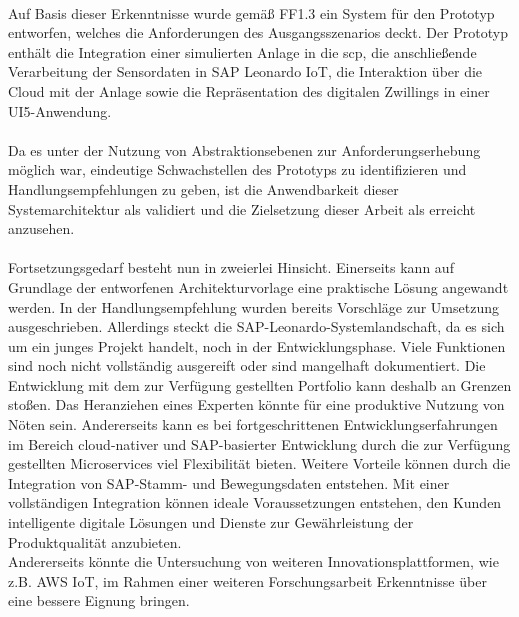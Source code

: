 \\ Auf Basis dieser Erkenntnisse wurde gemäß FF1.3 ein System für den Prototyp entworfen, welches die Anforderungen des Ausgangsszenarios deckt. Der Prototyp enthält die Integration einer simulierten Anlage in die \ac{scp}, die anschließende Verarbeitung der Sensordaten in SAP Leonardo IoT, die Interaktion über die Cloud mit der Anlage sowie die Repräsentation des digitalen Zwillings in einer UI5-Anwendung. 
\\\\%
Da es unter der Nutzung von Abstraktionsebenen zur Anforderungserhebung möglich war, eindeutige Schwachstellen des Prototyps zu identifizieren und Handlungsempfehlungen zu geben, ist die Anwendbarkeit dieser Systemarchitektur als validiert und die Zielsetzung dieser Arbeit als erreicht anzusehen. 
\\\\ Fortsetzungsgedarf besteht nun in zweierlei Hinsicht. Einerseits kann auf Grundlage der entworfenen Architekturvorlage eine praktische Lösung angewandt werden. In der Handlungsempfehlung wurden bereits Vorschläge zur Umsetzung ausgeschrieben. Allerdings steckt die SAP-Leonardo-Systemlandschaft, da es sich um ein junges Projekt handelt, noch in der Entwicklungsphase. Viele Funktionen sind noch nicht vollständig ausgereift oder sind mangelhaft dokumentiert. Die Entwicklung mit dem zur Verfügung gestellten Portfolio kann deshalb an Grenzen stoßen. Das Heranziehen eines Experten könnte für eine produktive Nutzung von Nöten sein. Andererseits kann es bei fortgeschrittenen Entwicklungserfahrungen im Bereich cloud-nativer und SAP-basierter Entwicklung durch die zur Verfügung gestellten Microservices viel Flexibilität bieten.  Weitere Vorteile können durch die  Integration von SAP-Stamm- und Bewegungsdaten entstehen. Mit einer vollständigen Integration können ideale Voraussetzungen entstehen, den Kunden intelligente digitale Lösungen und Dienste zur Gewährleistung der Produktqualität anzubieten. 
\\Andererseits könnte die Untersuchung von weiteren Innovationsplattformen, wie z.B. AWS IoT, im Rahmen einer weiteren Forschungsarbeit Erkenntnisse über eine bessere Eignung bringen. 
\newpage
